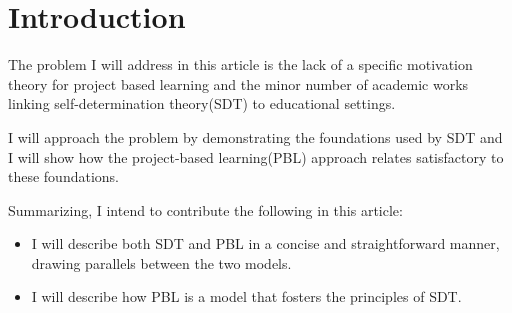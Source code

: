 \section{Introduction}
The problem I will address in this article is the lack of a specific motivation
theory for project based learning and the minor number of academic
works linking self-determination theory(SDT) to educational settings.

I will approach the problem by demonstrating the foundations used by SDT and I
will show how the project-based learning(PBL) approach relates satisfactory to
these foundations. 

Summarizing, I intend to contribute the following in this article:

\begin{itemize}
 
    \item I will describe both SDT and PBL in a concise and straightforward manner,
    drawing parallels between the two models.

    \item I will describe how PBL is a model that fosters the principles of SDT.

\end{itemize}

